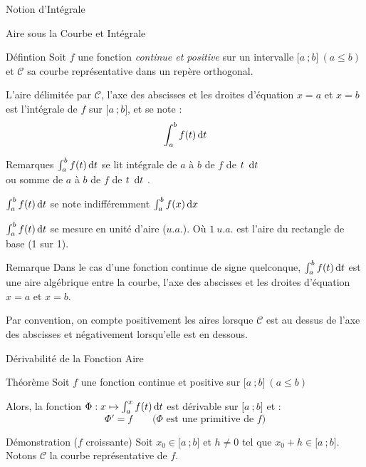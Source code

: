 \documentclass{coursbook}
\begin{document}
    \begin{Gpartie}{Notion d'Intégrale} 
        \begin{Spartie}{Aire sous la Courbe et Intégrale} 
            \begin{SSpartie}{Défintion} 
                Soit $f$ une fonction \emph{continue et positive} sur un intervalle $\big[a~;b\big]~\left(a\leq b\right)$ et $\mathcal{C}$ sa courbe représentative dans un repère orthogonal.

                L'aire délimitée par $\mathcal{C}$, l'axe des abscisses et les droites d'équation $x=a$ et $x=b$ est l'intégrale de $f$ sur $\big[a~;b\big]$, et se note : \[\int_a^b f(t)\,\mathrm{d}t\]
            \end{SSpartie}
            \begin{SSpartie}{Remarques} 
                $\int_a^b f(t)\,\mathrm{d}t$ se lit \og intégrale de $a$ à $b$ de $f$ de $t~\,\mathrm{d}t$ \fg{} \\ ou \og somme de $a$ à $b$ de $f$ de $t~\,\mathrm{d}t$ \fg{}.

                $\int_a^b f(t)\,\mathrm{d}t$ se note indifféremment $\int_a^b f(x)\,\mathrm{d}x$

                $\int_a^b f(t)\,\mathrm{d}t$ se mesure en unité d'aire ($u.a.$). Où $1~u.a.$ est l'aire du rectangle de base (1 sur 1).
            \end{SSpartie}
            \begin{SSpartie}{Remarque} 
                Dans le cas d'une fonction continue de signe quelconque, $\int_a^b f(t)\,\mathrm{d}t$ est une aire algébrique entre la courbe, l'axe des abscisses et les droites d'équation $x=a$ et $x=b$.

                Par convention, on compte positivement les aires lorsque $\mathcal{C}$ est au dessus de l'axe des abscisses et négativement lorsqu'elle est en dessous.
            \end{SSpartie}
        \end{Spartie} \pagebreak
        \begin{Spartie}{Dérivabilité de la Fonction Aire} 
            \begin{SSpartie}{Théorème} 
                Soit $f$ une fonction continue et positive sur $\big[a~;b\big]~\left(a\leq b\right)$

                Alors, la fonction $\Phi:x\mapsto\int_a^xf(t)\,\mathrm{d}t$ est dérivable sur $\big[a~;b\big]$ et : \[\Phi'=f\qquad\text{($\Phi$ est une primitive de $f$)}\]
                \begin{SSSpartie}{Démonstration \big($f$ croissante\big)} 
                    Soit $x_0\in\big[a~;b\big]$ et $h\neq 0$ tel que $x_0+h\in\big[a~;b\big]$. Notons $\mathcal{C}$ la courbe représentative de $f$.


\end{SSSpartie}
\end{SSpartie}
\end{Spartie}
\end{Gpartie}
\end{document}

